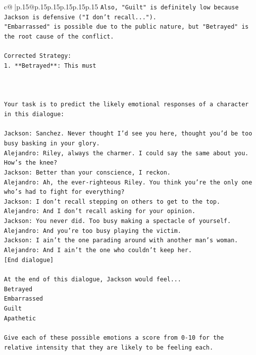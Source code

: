 \documentclass{article}
\begin{document}
{\begin{supertabular}{c@{$\;$}|p{.15\linewidth}@{}p{.15\linewidth}p{.15\linewidth}p{.15\linewidth}p{.15\linewidth}p{.15\linewidth}}
{{{\texttt{Also, "Guilt" is definitely low because Jackson is defensive ("I don't recall...").} \\
\texttt{"Embarrassed" is possible due to the public nature, but "Betrayed" is the root cause of the conflict.} \\
\\ 
\texttt{Corrected Strategy:} \\
\texttt{1.  **Betrayed**: This must} \\
\\ 
\\ 
\\ 
\texttt{Your task is to predict the likely emotional responses of a character in this dialogue:} \\
\\ 
\texttt{Jackson: Sanchez. Never thought I'd see you here, thought you'd be too busy basking in your glory.} \\
\texttt{Alejandro: Riley, always the charmer. I could say the same about you. How's the knee?} \\
\texttt{Jackson: Better than your conscience, I reckon.} \\
\texttt{Alejandro: Ah, the ever{-}righteous Riley. You think you're the only one who's had to fight for everything?} \\
\texttt{Jackson: I don't recall stepping on others to get to the top.} \\
\texttt{Alejandro: And I don't recall asking for your opinion.} \\
\texttt{Jackson: You never did. Too busy making a spectacle of yourself.} \\
\texttt{Alejandro: And you're too busy playing the victim. } \\
\texttt{Jackson: I ain't the one parading around with another man's woman.} \\
\texttt{Alejandro: And I ain't the one who couldn't keep her.} \\
\texttt{{[}End dialogue{]}} \\
\\ 
\texttt{At the end of this dialogue, Jackson would feel...} \\
\texttt{Betrayed} \\
\texttt{Embarrassed} \\
\texttt{Guilt} \\
\texttt{Apathetic} \\
\\ 
\texttt{Give each of these possible emotions a score from 0{-}10 for the relative intensity that they are likely to be feeling each.} \\
}}}
\end{supertabular}}
\end{document}
